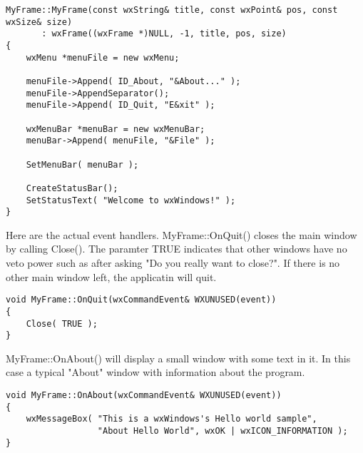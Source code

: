 \begin{verbatim}
MyFrame::MyFrame(const wxString& title, const wxPoint& pos, const wxSize& size)
       : wxFrame((wxFrame *)NULL, -1, title, pos, size)
{
    wxMenu *menuFile = new wxMenu;

    menuFile->Append( ID_About, "&About..." );
    menuFile->AppendSeparator();
    menuFile->Append( ID_Quit, "E&xit" );

    wxMenuBar *menuBar = new wxMenuBar;
    menuBar->Append( menuFile, "&File" );

    SetMenuBar( menuBar );

    CreateStatusBar();
    SetStatusText( "Welcome to wxWindows!" );
}
\end{verbatim}

Here are the actual event handlers. MyFrame::OnQuit() closes the main window
by calling Close(). The paramter TRUE indicates that other windows have no veto
power such as after asking "Do you really want to close?". If there is no other 
main window left, the applicatin will quit.

\begin{verbatim}
void MyFrame::OnQuit(wxCommandEvent& WXUNUSED(event))
{
    Close( TRUE );
}
\end{verbatim}

MyFrame::OnAbout() will display a small window with some text in it. In this
case a typical "About" window with information about the program.

\begin{verbatim}
void MyFrame::OnAbout(wxCommandEvent& WXUNUSED(event))
{
    wxMessageBox( "This is a wxWindows's Hello world sample",
                  "About Hello World", wxOK | wxICON_INFORMATION );
}
\end{verbatim}

